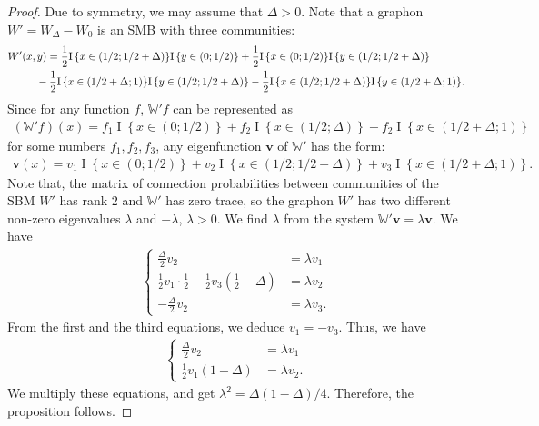 \documentclass[11pt]{article}
\newcommand{\bv}{\bm{v}}
\newcommand{\bbW}{\mathbb{W}}
\newcommand{\indicator}[1]{{\operatorname{I} \left \{ #1\right \}}}
\newcommand{\<}{\langle}
\renewcommand{\>}{\rangle}
\theoremstyle{plain}
\theoremstyle{definition}
\theoremstyle{remark}
\begin{document}
{\begin{proof}
    Due to symmetry, we may assume that $\Delta > 0$. Note that a graphon $W' = W_{\Delta} - W_0$ is an SMB with three communities:
    \begin{align*}
        W'(x, y) & = \frac{1}{2} \indicator{x \in (1/2; 1/2 + \Delta)} \indicator{y \in (0; 1/2)} + \frac{1}{2} \indicator{x \in (0; 1/2)} \indicator{y \in (1/2; 1/2 + \Delta)} \\ 
         &\hskip -0.7 cm \quad - \frac{1}{2} \indicator{x \in (1/2 + \Delta; 1)} \indicator{y \in (1/2; 1/2 + \Delta)} - \frac{1}{2} \indicator{x \in (1/2; 1/2 + \Delta)} \indicator{y \in (1/2 + \Delta; 1)}.
    \end{align*}
    Since for any function $f$, $\bbW' f$ can be represented as
    \begin{align*}
        (\bbW' f)(x) = f_1 \indicator{x \in (0; 1/2)} + f_2 \indicator{x \in (1/2; \Delta)} + f_2 \indicator{x \in (1/2 + \Delta; 1)}
    \end{align*}
    for some numbers $f_1, f_2, f_3$,
    any eigenfunction $\bv$ of $\bbW'$ has the form:
    \begin{align*}
        \bv(x) = v_1 \indicator{x \in (0; 1/2)} + v_2 \indicator{x \in (1/2; {1/2 +}\Delta)} + v_3 \indicator{x \in (1/2 + \Delta; 1)}.
    \end{align*}
    Note that, the matrix of connection probabilities between communities of the SBM $W'$ has rank $2$  and $\bbW'$ has zero trace, so the graphon $W'$ has two different non-zero eigenvalues $\lambda$ and $-\lambda$, $\lambda > 0$. We find $\lambda$ from the system $\bbW' \bv = \lambda \bv$. We have
    \begin{align*}
        \begin{cases}
            \frac{\Delta}{2} v_2 & = \lambda v_1 \\
            \frac{1}{2} v_1 \cdot \frac{1}{2}- \frac{1}{2} v_3  \left ( \frac{1}{2} - \Delta \right )& = \lambda v_2 \\
            - \frac{\Delta}{2} v_2 & = \lambda v_3.
        \end{cases}
    \end{align*}
    From the first and the third equations, we deduce $v_1 =  - v_3$. Thus, we have
    \begin{align*}
        \begin{cases}
            \frac{\Delta}{2} v_2 & = \lambda v_1 \\
            \frac{1}{2} v_1 (1 - \Delta) & = \lambda v_2.
        \end{cases}
    \end{align*}
We multiply these equations, and get $\lambda^2 = \Delta (1 - \Delta) / 4$. Therefore, the proposition follows.
\end{proof}

}
\end{document}
